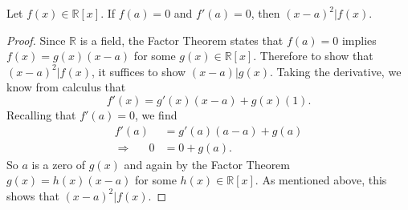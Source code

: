 \documentclass{article}
\newenvironment{problem1}[1]{\noindent {\bf Problem #1:}}
{\medskip}
\begin{document}
\begin{problem1}{6} Let $f(x)\in\mathbb{R}[x]$. If $f(a)=0$ and $f'(a)=0$, then $(x-a)^2\big\vert f(x).$
\begin{proof} Since $\mathbb{R}$ is a field, the Factor Theorem states that $f(a)=0$ implies $f(x)=g(x)(x-a)$ for some $g(x)\in\mathbb{R}[x]$. Therefore to show that $(x-a)^2\big\vert f(x)$, it suffices to show $(x-a)\big\vert g(x)$. Taking the derivative, we know from calculus that $$f'(x)=g'(x)(x-a)+g(x)(1).$$ Recalling that $f'(a)=0$, we find \begin{align*} f'(a)&=g'(a)(a-a)+g(a)\\
\Longrightarrow\phantom{111} 0&=0+g(a).\end{align*} So $a$ is a zero of $g(x)$ and again by the Factor Theorem $g(x)=h(x)(x-a)$ for some $h(x)\in \mathbb{R}[x]$. As mentioned above, this shows that $(x-a)^2\big\vert f(x)$.
\end{proof}

\end{problem1}
\end{document}

